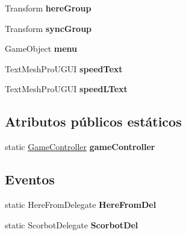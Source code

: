 \begin{DoxyCompactItemize}
\mbox{\label{class_game_controller_adc5d9c82337016042d0a4b7a431b8a0e}} 
Transform {\bfseries here\+Group}
\item 
\mbox{\label{class_game_controller_aef6447cf8e9a9e5945a45e0a0d4cbeea}} 
Transform {\bfseries sync\+Group}
\item 
\mbox{\label{class_game_controller_af4c293b5d621fe28f1e6b72f9efa293f}} 
Game\+Object {\bfseries menu}
\item 
\mbox{\label{class_game_controller_ae2a547ae9f7294b4c3d7064ff037b7d1}} 
Text\+Mesh\+Pro\+U\+G\+UI {\bfseries speed\+Text}
\item 
\mbox{\label{class_game_controller_a80a5ddb548350ff8522690213155ffc7}} 
Text\+Mesh\+Pro\+U\+G\+UI {\bfseries speed\+L\+Text}
\end{DoxyCompactItemize}
\subsection*{Atributos públicos estáticos}
\begin{DoxyCompactItemize}
\item 
\mbox{\label{class_game_controller_a46ccbbf4e13ee78f28da6b0ed2595cf3}} 
static \mbox{\hyperlink{class_game_controller}{Game\+Controller}} {\bfseries game\+Controller}
\end{DoxyCompactItemize}
\subsection*{Eventos}
\begin{DoxyCompactItemize}
\item 
\mbox{\label{class_game_controller_acb69ab50fb463c78d7d47e94edf85a9e}} 
static Here\+From\+Delegate {\bfseries Here\+From\+Del}
\item 
\mbox{\label{class_game_controller_a801ce04758bfd9d108cc1e0161bb50d8}} 
static Scorbot\+Delegate {\bfseries Scorbot\+Del}
\end{DoxyCompactItemize}
